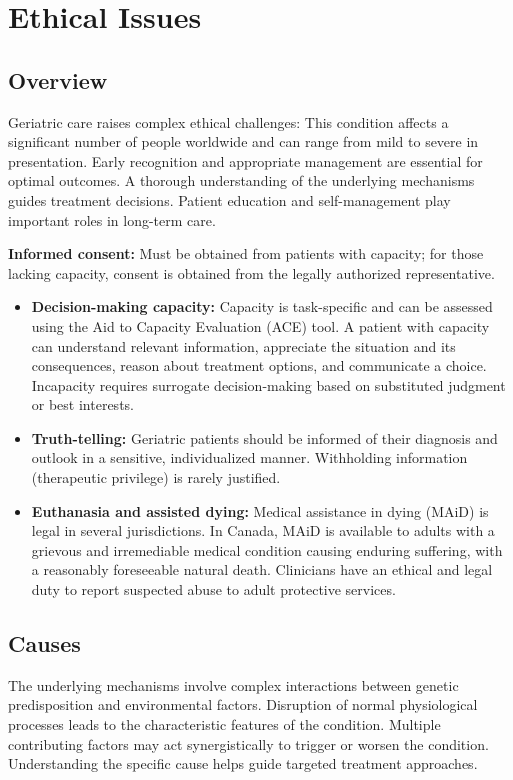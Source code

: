 \chapter{Ethical Issues}
\label{sec:Ethical Issues}

\section{Overview}
Geriatric care raises complex ethical challenges: This condition affects a significant number of people worldwide and can range from mild to severe in presentation. Early recognition and appropriate management are essential for optimal outcomes. A thorough understanding of the underlying mechanisms guides treatment decisions. Patient education and self-management play important roles in long-term care.

\textbf{Informed consent:} Must be obtained from patients with capacity; for those lacking capacity, consent is obtained from the legally authorized representative.

\begin{itemize}[noitemsep]
  \item \textbf{Decision-making capacity:} Capacity is task-specific and can be assessed using the Aid to Capacity Evaluation (ACE) tool. A patient with capacity can understand relevant information, appreciate the situation and its consequences, reason about treatment options, and communicate a choice. Incapacity requires surrogate decision-making based on substituted judgment or best interests.
  \item \textbf{Truth-telling:} Geriatric patients should be informed of their diagnosis and outlook in a sensitive, individualized manner. Withholding information (therapeutic privilege) is rarely justified.
  \item \textbf{Euthanasia and assisted dying:} Medical assistance in dying (MAiD) is legal in several jurisdictions. In Canada, MAiD is available to adults with a grievous and irremediable medical condition causing enduring suffering, with a reasonably foreseeable natural death. Clinicians have an ethical and legal duty to report suspected abuse to adult protective services.
\end{itemize}
\section{Causes}
The underlying mechanisms involve complex interactions between genetic predisposition and environmental factors. Disruption of normal physiological processes leads to the characteristic features of the condition. Multiple contributing factors may act synergistically to trigger or worsen the condition. Understanding the specific cause helps guide targeted treatment approaches.

